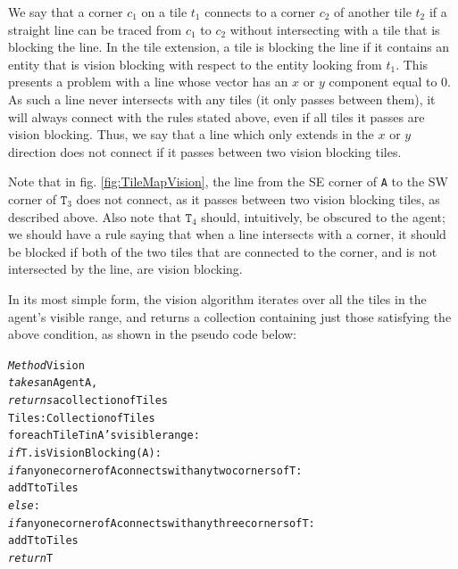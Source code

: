 We say that a corner $c_{1}$ on a tile $t_{1}$ connects to a corner
$c_{2}$ of another tile $t_{2}$ if a straight line can be traced
from $c_{1}$ to $c_{2}$ without intersecting with a tile that is
blocking the line. In the tile extension, a tile is blocking the line
if it contains an entity that is vision blocking with respect to the
entity looking from $t_{1}$. This presents a problem with a line
whose vector has an $x$ or $y$ component equal to 0. As such a line
never intersects with any tiles (it only passes between them), it
will always connect with the rules stated above, even if all tiles
it passes are vision blocking. Thus, we say that a line which only
extends in the $x$ or $y$ direction does not connect if it passes
between two vision blocking tiles.

Note that in fig. \ref{fig:TileMapVision}, the line from the SE corner
of \texttt{A} to the SW corner of $\mathtt{T}_{3}$ does not connect,
as it passes between two vision blocking tiles, as described above.
Also note that $\mathtt{T}_{4}$ should, intuitively, be obscured
to the agent; we should have a rule saying that when a line intersects
with a corner, it should be blocked if both of the two tiles that
are connected to the corner, and is not intersected by the line, are
vision blocking.

In its most simple form, the vision algorithm iterates over all the
tiles in the agent's visible range, and returns a collection containing
just those satisfying the above condition, as shown in the pseudo
code below:

\begin{alltt}
\textit{Method} Vision 
        \textit{takes} an Agent A, 
        \textit{returns} a collection of Tiles
    Tiles : Collection of Tiles
    for each Tile T in A's visible range:
        \textit{if} T.isVisionBlocking(A):
            \textit{if} any one corner of A connects with any two corners of T:
                add T to Tiles
        \textit{else}:
            \textit{if} any one corner of A connects with any three corners of T:
                add T to Tiles
    \textit{return} T
\end{alltt}

